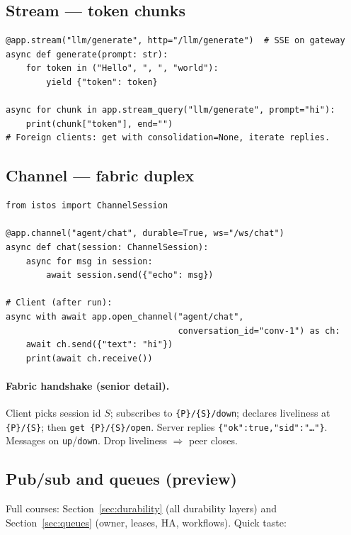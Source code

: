 \documentclass[11pt,a4paper]{article}
\begin{document}
\subsection{Stream --- token chunks}

\begin{lstlisting}
@app.stream("llm/generate", http="/llm/generate")  # SSE on gateway
async def generate(prompt: str):
    for token in ("Hello", ", ", "world"):
        yield {"token": token}

async for chunk in app.stream_query("llm/generate", prompt="hi"):
    print(chunk["token"], end="")
# Foreign clients: get with consolidation=None, iterate replies.
\end{lstlisting}

\subsection{Channel --- fabric duplex}

\begin{lstlisting}
from istos import ChannelSession

@app.channel("agent/chat", durable=True, ws="/ws/chat")
async def chat(session: ChannelSession):
    async for msg in session:
        await session.send({"echo": msg})

# Client (after run):
async with await app.open_channel("agent/chat",
                                  conversation_id="conv-1") as ch:
    await ch.send({"text": "hi"})
    print(await ch.receive())
\end{lstlisting}

\paragraph{Fabric handshake (senior detail).}
Client picks session id \(S\); subscribes to \texttt{\{P\}/\{S\}/down}; declares
liveliness at \texttt{\{P\}/\{S\}}; then \texttt{get \{P\}/\{S\}/open}. Server
replies \texttt{\{"ok":true,"sid":"\ldots"\}}. Messages on \texttt{up}/\texttt{down}.
Drop liveliness $\Rightarrow$ peer closes.

\subsection{Pub/sub and queues (preview)}

Full courses: Section~\ref{sec:durability} (all durability layers) and
Section~\ref{sec:queues} (owner, leases, HA, workflows). Quick taste:
\end{document}
